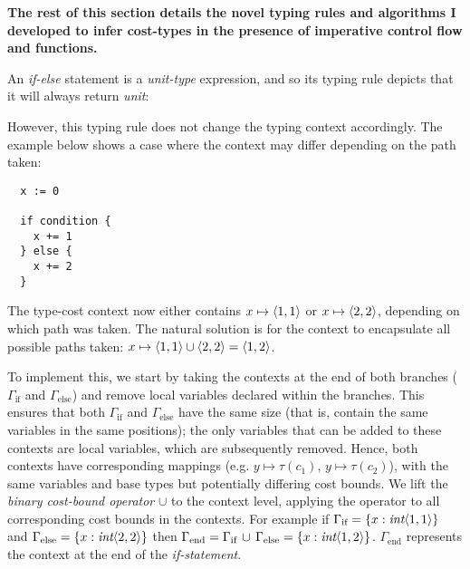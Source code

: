 \vspace{5mm}

\textbf{The rest of this section details the novel typing rules and algorithms I developed to infer cost-types in the presence of imperative control flow and functions.}

An \textit{if-else} statement is a \textit{unit-type} expression, and so its typing rule depicts that it will always return \textit{unit}:

\begin{prooftree}
\end{prooftree}

However, this typing rule does not change the typing context accordingly. The example below shows a case where the context may differ depending on the path taken:

\begin{verbatim}
  x := 0 

  if condition {
    x += 1
  } else {    
    x += 2
  }           
\end{verbatim}

The type-cost context now either contains \( x \mapsto \bound{1}{1} \) or \( x \mapsto \bound{2}{2} \), depending on which path was taken. The natural solution is for the context to encapsulate all possible paths taken: \( x \mapsto \bound{1}{1} \cup \bound{2}{2} = \bound{1}{2} \).

To implement this, we start by taking the contexts at the end of both branches (\( \Gamma_\text{if} \) and \( \Gamma_\text{else} \)) and remove local variables declared within the branches. This ensures that both \( \Gamma_\text{if} \) and \( \Gamma_\text{else} \) have the same size (that is, contain the same variables in the same positions); the only variables that can be added to these contexts are local variables, which are subsequently removed. Hence, both contexts have corresponding mappings (e.g. \( y \mapsto \tau(c_1) \), \( y \mapsto \tau(c_2) \)), with the same variables and base types but potentially differing cost bounds. We lift the \textit{binary cost-bound operator} \( \cup \) to the context level, applying the operator to all corresponding cost bounds in the contexts. For example if \( \Gamma_\text{if} = \{ x: \textit{int}\bound{1}{1} \} \) and \( \Gamma_\text{else} = \{ x: \textit{int}\bound{2}{2} \} \) then \( \Gamma_\text{end} = \Gamma_\text{if} \, \cup \, \Gamma_\text{else} = \{ x: \textit{int}\bound{1}{2} \} \). \( \Gamma_\text{end} \) represents the context at the end of the \textit{if-statement}.

